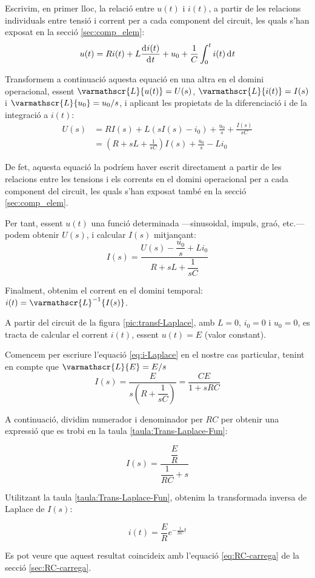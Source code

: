 Escrivim, en primer lloc,  la relació entre $u(t)$ i $i(t)$, a partir
de les relacions individuals entre tensió i corrent per a cada
component del circuit, les quals s'han exposat en la secció
\vref{sec:comp_elem}:
\begin{equation}
    u(t) = R i(t) + L \frac{\diff i(t)}{\diff t} + u_0 + \frac{1}{C}
    \int_0^t i(t) \diff t
\end{equation}

Transformem a continuació aquesta equació en una altra en el domini
operacional, essent $\varmathscr{L}\{u(t)\} = U(s)$,
$\varmathscr{L}\{i(t)\} = I(s)$ i $\varmathscr{L}\{u_0\} =
u_0/s$, i aplicant les propietats de la diferenciació i de la
integració a $i(t)$:
\begin{equation}\begin{split}
    U(s) &= R I(s) + L(s I(s) -i_0) + \frac{u_0}{s} + \frac{I(s)}{s
    C} \\[1ex]
    &= \left( R + s L +\frac{1}{s C}\right)I(s) + \frac{u_0}{s} - L i_0
\end{split}\end{equation}

De fet, aquesta equació la podríem haver escrit directament a
partir de les relacions entre les tensions i els corrents en el
domini operacional per a cada  component del circuit, les quals
s'han exposat també en la secció \ref{sec:comp_elem}.

Per tant, essent $u(t)$  una funció determinada  ---sinusoidal, impuls,
graó, etc.--- podem obtenir $U(s)$, i calcular $I(s)$ mitjançant:
\begin{equation}
    I(s) = \frac{U(s)-\dfrac{u_0}{s} + L i_0}{R + s L
    +\dfrac{1}{s C}}\label{eq:i-Laplace}
\end{equation}

Finalment, obtenim el corrent en el domini temporal: $i(t) =
\varmathscr{L}^{-1}\{I(s)\}$.

	
\begin{exemple}[\ResCircRC{}]
	\addcontentsxms{\ResCircRC}
    A partir del circuit de la figura \vref{pic:transf-Laplace}, amb
    $L=0$, $i_0=0$ i $u_0=0$, es tracta de calcular el corrent $i(t)$,
    essent $u(t)=E$ (valor constant).

    Comencem per escriure l'equació \eqref{eq:i-Laplace} en el nostre
    cas particular, tenint en compte que $\varmathscr{L}\{E\} = E/s$
    \[
        I(s) = \frac{E}{s\left(R + \dfrac{1}{s C}\right)} = \frac{C E}{1 + s R C}
    \]

    A continuació, dividim numerador i denominador per $R C$ per obtenir una expressió que es trobi en la taula
    \vref{taula:Trans-Laplace-Fun}:

    \[
        I(s) = \frac{\dfrac{E}{R}}{\dfrac{1}{R C} + s}
    \]

    Utilitzant la taula \vref{taula:Trans-Laplace-Fun}, obtenim la transformada inversa de Laplace de $I(s)$:

    \[
        i(t) = \frac{E}{R} e^{-\frac{1}{R C}t}
    \]

    Es pot veure que aquest resultat coincideix amb l'equació \eqref{eq:RC-carrega} de la secció \vref{sec:RC-carrega}.
\end{exemple}


